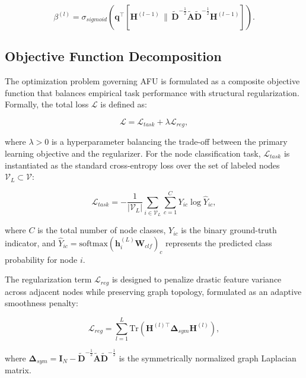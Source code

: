 \documentclass[10pt,twocolumn]{article}
\begin{document}
\begin{equation}
\beta^{(l)} = \sigma_{sigmoid}\left(\mathbf{q}^\top \left[ \mathbf{H}^{(l-1)} \,\|\, \tilde{\mathbf{D}}^{-\frac{1}{2}} \tilde{\mathbf{A}} \tilde{\mathbf{D}}^{-\frac{1}{2}} \mathbf{H}^{(l-1)} \right]\right).
\end{equation}

\subsection{Objective Function Decomposition}

The optimization problem governing \textsc{AFU} is formulated as a composite objective function that balances empirical task performance with structural regularization. Formally, the total loss $\mathcal{L}$ is defined as:

\begin{equation}
\mathcal{L} = \mathcal{L}_{task} + \lambda \mathcal{L}_{reg},
\end{equation}

where $\lambda > 0$ is a hyperparameter balancing the trade-off between the primary learning objective and the regularizer. For the node classification task, $\mathcal{L}_{task}$ is instantiated as the standard cross-entropy loss over the set of labeled nodes $\mathcal{V}_L \subset \mathcal{V}$:

\begin{equation}
\mathcal{L}_{task} = -\frac{1}{|\mathcal{V}_L|} \sum_{i \in \mathcal{V}_L} \sum_{c=1}^{C} Y_{ic} \log \hat{Y}_{ic},
\end{equation}

where $C$ is the total number of node classes, $Y_{ic}$ is the binary ground-truth indicator, and $\hat{Y}_{ic} = \text{softmax}(\mathbf{h}_i^{(L)}\mathbf{W}_{clf})_{c}$ represents the predicted class probability for node $i$. 

The regularization term $\mathcal{L}_{reg}$ is designed to penalize drastic feature variance across adjacent nodes while preserving graph topology, formulated as an adaptive smoothness penalty:

\begin{equation}
\mathcal{L}_{reg} = \sum_{l=1}^{L} \text{Tr}\left( \mathbf{H}^{(l)\top} \mathbf{\Delta}_{sym} \mathbf{H}^{(l)} \right),
\end{equation}

where $\mathbf{\Delta}_{sym} = \mathbf{I}_N - \tilde{\mathbf{D}}^{-\frac{1}{2}} \tilde{\mathbf{A}} \tilde{\mathbf{D}}^{-\frac{1}{2}}$ is the symmetrically normalized graph Laplacian matrix.
\end{document}

